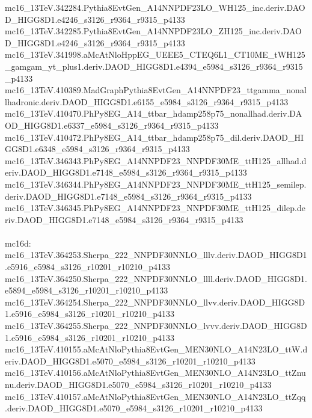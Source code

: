 \begin{scriptsize}
mc16\_13TeV.342284.Pythia8EvtGen\_A14NNPDF23LO\_WH125\_inc.deriv.DAOD\_HIGG8D1.e4246\_s3126\_r9364\_r9315\_p4133 \\
mc16\_13TeV.342285.Pythia8EvtGen\_A14NNPDF23LO\_ZH125\_inc.deriv.DAOD\_HIGG8D1.e4246\_s3126\_r9364\_r9315\_p4133 \\
mc16\_13TeV.341998.aMcAtNloHppEG\_UEEE5\_CTEQ6L1\_CT10ME\_tWH125\_gamgam\_yt\_plus1.deriv.DAOD\_HIGG8D1.e4394\_e5984\_s3126\_r9364\_r9315\_p4133 \\
mc16\_13TeV.410389.MadGraphPythia8EvtGen\_A14NNPDF23\_ttgamma\_nonallhadronic.deriv.DAOD\_HIGG8D1.e6155\_e5984\_s3126\_r9364\_r9315\_p4133 \\
mc16\_13TeV.410470.PhPy8EG\_A14\_ttbar\_hdamp258p75\_nonallhad.deriv.DAOD\_HIGG8D1.e6337\_e5984\_s3126\_r9364\_r9315\_p4133 \\
mc16\_13TeV.410472.PhPy8EG\_A14\_ttbar\_hdamp258p75\_dil.deriv.DAOD\_HIGG8D1.e6348\_e5984\_s3126\_r9364\_r9315\_p4133 \\
mc16\_13TeV.346343.PhPy8EG\_A14NNPDF23\_NNPDF30ME\_ttH125\_allhad.deriv.DAOD\_HIGG8D1.e7148\_e5984\_s3126\_r9364\_r9315\_p4133 \\
mc16\_13TeV.346344.PhPy8EG\_A14NNPDF23\_NNPDF30ME\_ttH125\_semilep.deriv.DAOD\_HIGG8D1.e7148\_e5984\_s3126\_r9364\_r9315\_p4133 \\
mc16\_13TeV.346345.PhPy8EG\_A14NNPDF23\_NNPDF30ME\_ttH125\_dilep.deriv.DAOD\_HIGG8D1.e7148\_e5984\_s3126\_r9364\_r9315\_p4133 \\
 \\
mc16d: \\
mc16\_13TeV.364253.Sherpa\_222\_NNPDF30NNLO\_lllv.deriv.DAOD\_HIGG8D1.e5916\_e5984\_s3126\_r10201\_r10210\_p4133 \\
mc16\_13TeV.364250.Sherpa\_222\_NNPDF30NNLO\_llll.deriv.DAOD\_HIGG8D1.e5894\_e5984\_s3126\_r10201\_r10210\_p4133 \\
mc16\_13TeV.364254.Sherpa\_222\_NNPDF30NNLO\_llvv.deriv.DAOD\_HIGG8D1.e5916\_e5984\_s3126\_r10201\_r10210\_p4133 \\
mc16\_13TeV.364255.Sherpa\_222\_NNPDF30NNLO\_lvvv.deriv.DAOD\_HIGG8D1.e5916\_e5984\_s3126\_r10201\_r10210\_p4133 \\
mc16\_13TeV.410155.aMcAtNloPythia8EvtGen\_MEN30NLO\_A14N23LO\_ttW.deriv.DAOD\_HIGG8D1.e5070\_e5984\_s3126\_r10201\_r10210\_p4133 \\
mc16\_13TeV.410156.aMcAtNloPythia8EvtGen\_MEN30NLO\_A14N23LO\_ttZnunu.deriv.DAOD\_HIGG8D1.e5070\_e5984\_s3126\_r10201\_r10210\_p4133 \\
mc16\_13TeV.410157.aMcAtNloPythia8EvtGen\_MEN30NLO\_A14N23LO\_ttZqq.deriv.DAOD\_HIGG8D1.e5070\_e5984\_s3126\_r10201\_r10210\_p4133 \\

\end{scriptsize}
